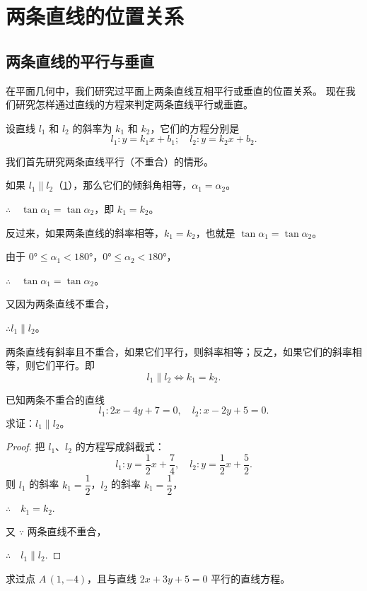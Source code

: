 \section{两条直线的位置关系}
\subsection{两条直线的平行与垂直}
在平面几何中，我们研究过平面上两条直线互相平行或垂直的位置关系。
现在我们研究怎样通过直线的方程来判定两条直线平行或垂直。

设直线 $l_1$ 和 $l_2$ 的斜率为 $k_1$ 和 $k_2$，它们的方程分别是
\[ l_1:y =k_1x+b_1;\quad l_2:y =k_2x+b_2. \]

我们首先研究两条直线平行（不重合）的情形。

如果 $l_1\parallel l_2$（\cref{fig:1-29}），那么它们的倾斜角相等，$\alpha_1=\alpha_2$。

\begin{figure}
  \caption{}\label{fig:1-29}
\end{figure}

$\therefore \quad \tan\alpha_1=\tan\alpha_2$，即 $k_1=k_2$。

反过来，如果两条直线的斜率相等，$k_1=k_2$，也就是 $\tan\alpha_1=\tan\alpha_2$。

由于 $\ang{0}\leqslant\alpha_1<\ang{180}$，$\ang{0}\leqslant\alpha_2<\ang{180}$，

$\therefore \quad \tan\alpha_1=\tan\alpha_2$。

又因为两条直线不重合，

$\therefore l_1\parallel l_2$。

两条直线有斜率且不重合，如果它们平行，则斜率相等；反之，如果它们的斜率相等，则它们平行。即
\[ l_1\parallel l_2 \Leftrightarrow k_1=k_2.\]
\begin{example}
  已知两条不重合的直线
  \[ l_1:2x-4y+7=0,\quad l_2:x-2y+5=0. \]
  求证：$l_1\parallel l_2$。
\end{example}
\begin{proof}
  把 $l_1$、$l_2$ 的方程写成斜截式：
  \[ l_1:y=\frac{1}{2}x+\frac{7}{4},\quad l_2:y=\frac{1}{2}x+\frac{5}{2}. \]
  则 $l_1$ 的斜率 $k_1=\dfrac{1}{2}$，$l_2$ 的斜率 $k_1=\dfrac{1}{2}$，
  
  $\therefore\quad k_1=k_2.$

  又 $\because$ 两条直线不重合，

  $\therefore\quad l_1\parallel l_2.$
\end{proof}

\begin{example}
  求过点 $A\,(1,- 4)$，且与直线 $2x+3y+5=0$ 平行的直线方程。
\end{example}

